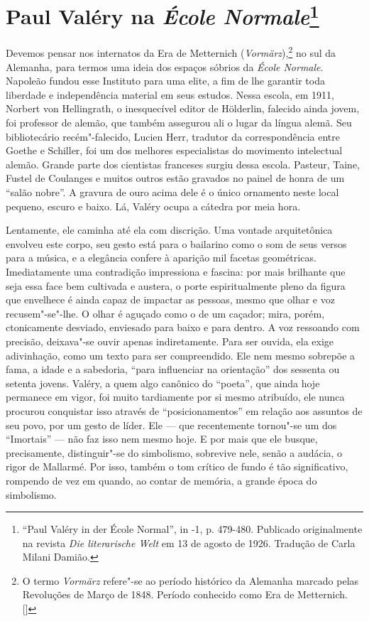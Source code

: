 \chapter{Paul Valéry na \emph{École Normale}\footnote[*]{``Paul Valéry in der École Normal'', in -1, p. 479-480. Publicado originalmente na revista \emph{Die literarische Welt} em 13 de agosto de 1926. Tradução de Carla Milani Damião.}}

Devemos pensar nos internatos da Era de Metternich
(\emph{Vormärz}),\footnote{O termo \emph{Vormärz} refere"-se ao período
  histórico da Alemanha marcado pelas Revoluções de Março de 1848.
  Período conhecido como Era de Metternich. []} no sul da
Alemanha, para termos uma ideia dos espaços sóbrios da \emph{École
Normale}. Napoleão fundou esse Instituto para uma elite, a fim de lhe
garantir toda liberdade e independência material em seus estudos. Nessa
escola, em 1911, Norbert von Hellingrath, o inesquecível editor de
Hölderlin, falecido ainda jovem, foi professor de alemão, que também
assegurou ali o lugar da língua alemã. Seu bibliotecário recém"-falecido,
Lucien Herr, tradutor da correspondência entre Goethe e Schiller, foi um
dos melhores especialistas do movimento intelectual alemão. Grande parte
dos cientistas franceses surgiu dessa escola. Pasteur, Taine, Fustel de
Coulanges e muitos outros estão gravados no painel de honra de um
``salão nobre''. A gravura de ouro acima dele é o único ornamento neste local
pequeno, escuro e baixo. Lá, Valéry ocupa a cátedra por meia
hora.

Lentamente, ele caminha até ela com discrição. Uma vontade
arquitetônica envolveu este corpo, seu gesto está para o bailarino como
o som de seus versos para a música, e a elegância confere à aparição mil
facetas geométricas. Imediatamente uma contradição impressiona e
fascina: por mais brilhante que seja essa face bem cultivada e austera,
o porte espiritualmente pleno da figura que envelhece é ainda capaz de
impactar as pessoas, mesmo que olhar e voz recusem"-se"-lhe. O olhar é
aguçado como o de um caçador; mira, porém, ctonicamente desviado, enviesado
para baixo e para dentro. A voz ressoando com precisão, deixava"-se ouvir apenas
indiretamente. Para ser ouvida, ela exige adivinhação, como um texto
para ser compreendido. Ele nem mesmo sobrepõe a fama, a idade e a sabedoria,
``para influenciar na orientação'' dos sessenta ou setenta jovens.
Valéry, a quem algo canônico do ``poeta'', que ainda hoje permanece em
vigor, foi muito tardiamente por si mesmo atribuído, ele nunca
procurou conquistar isso através de ``posicionamentos'' em relação aos
assuntos de seu povo, por um gesto de líder. Ele --- que recentemente
tornou"-se um dos ``Imortais'' --- não faz isso nem mesmo hoje. E por mais
que ele busque, precisamente, distinguir"-se do simbolismo, sobrevive nele, senão a audácia, o rigor de
Mallarmé. Por isso, também o
tom crítico de fundo é tão significativo, rompendo de vez em quando, ao
contar de memória, a grande época do simbolismo.

